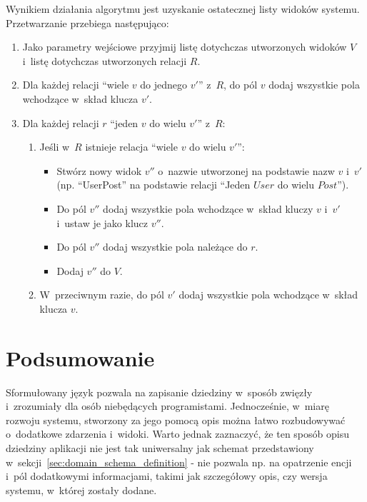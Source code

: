Wynikiem działania algorytmu jest uzyskanie ostatecznej listy widoków systemu.
Przetwarzanie przebiega następująco:

\begin{enumerate}
 \item Jako parametry wejściowe przyjmij listę dotychczas utworzonych widoków $V$ i~listę dotychczas utworzonych relacji $R$.
 
 \item Dla każdej relacji ``wiele $v$ do jednego $v'$'' z~$R$, do pól $v$ dodaj wszystkie pola wchodzące w~skład klucza $v'$.
 
 \item Dla każdej relacji $r$ ``jeden $v$ do wielu $v'$'' z~$R$:
  \begin{enumerate}
   \item Jeśli w~$R$ istnieje relacja ``wiele $v$ do wielu $v'$'':
    \begin{itemize}
     \item Stwórz nowy widok $v''$ o~nazwie utworzonej na podstawie nazw $v$ i~$v'$ (np. ``UserPost'' na podstawie relacji ``Jeden $User$ do wielu $Post$'').
     \item Do pól $v''$ dodaj wszystkie pola wchodzące w~skład kluczy $v$ i~$v'$ i~ustaw je jako klucz $v''$.
     \item Do pól $v''$ dodaj wszystkie pola należące do $r$.
     \item Dodaj $v''$ do $V$.
    \end{itemize}
   \item W~przeciwnym razie, do pól $v'$ dodaj wszystkie pola wchodzące w~skład klucza $v$.
  \end{enumerate}
\end{enumerate}



\section{Podsumowanie}

Sformułowany język pozwala na zapisanie dziedziny w~sposób zwięzły i~zrozumiały dla osób niebędących programistami.
Jednocześnie, w~miarę rozwoju systemu, stworzony za jego pomocą opis można łatwo rozbudowywać o~dodatkowe zdarzenia i~widoki.
Warto jednak zaznaczyć, że ten sposób opisu dziedziny aplikacji nie jest tak uniwersalny jak schemat przedstawiony w~sekcji~\ref{sec:domain_schema_definition} - nie pozwala np. na opatrzenie encji i~pól dodatkowymi informacjami, takimi jak szczegółowy opis, czy wersja systemu, w~której zostały dodane.

